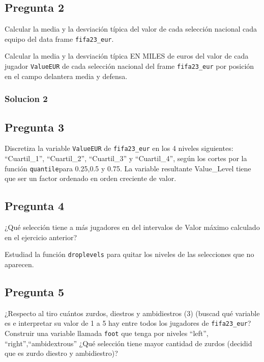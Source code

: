 \documentclass[
]{article}
\begin{document}
\hypertarget{pregunta-2}{%
\subsection{Pregunta 2}\label{pregunta-2}}

Calcular la media y la desviación típica del valor de cada selección
nacional cada equipo del data frame \texttt{fifa23\_eur}.

Calcular la media y la desviación típica EN MILES de euros del valor de
cada jugador \texttt{ValueEUR} de cada selección nacional del frame
\texttt{fifa23\_eur} por posición en el campo delantera media y defensa.

\hypertarget{solucion-2}{%
\subsubsection{Solucion 2}\label{solucion-2}}

\hypertarget{pregunta-3}{%
\subsection{Pregunta 3}\label{pregunta-3}}

Discretiza la variable \texttt{ValueEUR} de \texttt{fifa23\_eur} en los
4 niveles siguientes: ``Cuartil\_1'', ``Cuartil\_2'', ``Cuartil\_3'' y
``Cuartil\_4'', según los cortes por la función \texttt{quantile}para
0.25,0.5 y 0.75. La variable resultante Value\_Level tiene que ser un
factor ordenado en orden creciente de valor.

\hypertarget{pregunta-4}{%
\subsection{Pregunta 4}\label{pregunta-4}}

¿Qué selección tiene a más jugadores en del intervalos de Valor máximo
calculado en el ejercicio anterior?

Estudiad la función \texttt{droplevels} para quitar los niveles de las
selecciones que no aparecen.

\hypertarget{pregunta-5}{%
\subsection{Pregunta 5}\label{pregunta-5}}

¿Respecto al tiro cuántos zurdos, diestros y ambidiestros (3) (buscad
qué variable es e interpretar su valor de 1 a 5 hay entre todos los
jugadores de \texttt{fifa23\_eur}? Construir una variable llamada
\texttt{foot} que tenga por niveles ``left'', ``right'',``ambidextrous''
¿Qué selección tiene mayor cantidad de zurdos (decidid que es zurdo
diestro y ambidiestro)?
\end{document}
